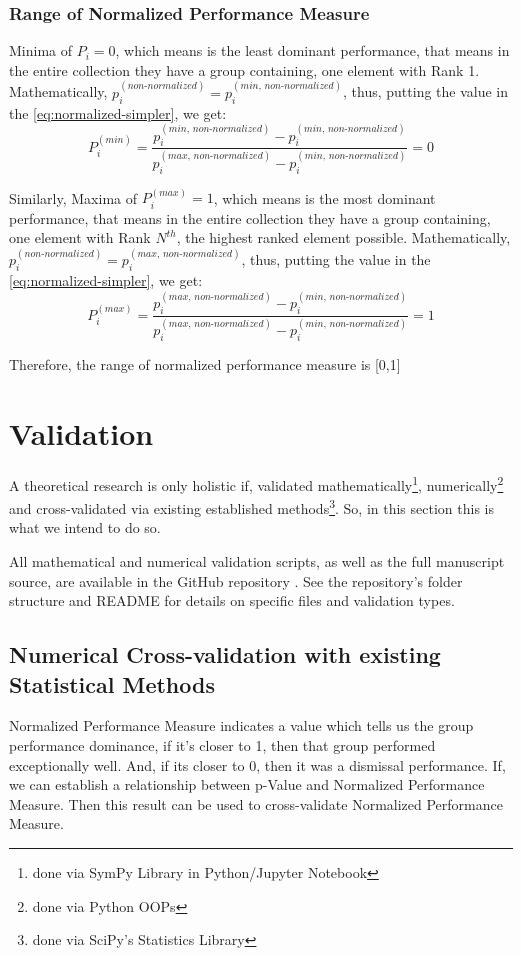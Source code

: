 \documentclass[a4paper,fleqn,review]{cas-sc}
\begin{document}
\subsubsection{Range of Normalized Performance Measure}
Minima of $P_i = 0$, which means is the least dominant performance, that means in the entire collection they have a group containing, one element with Rank 1. Mathematically, $p_i^{(non\text{-}normalized)} =  p_i^{(min, \, non\text{-}normalized)}$, thus, putting the value in the \autoref{eq:normalized-simpler}, we get:
\begin{equation}
	P_i^{(min)} = \frac{p_i^{(min, \, non\text{-}normalized)} - p_i^{(min, \, non\text{-}normalized)}}{p_i^{(max, \, non\text{-}normalized)} - p_i^{(min, \, non\text{-}normalized)}} = 0
\end{equation}

Similarly,
Maxima of $P_i^{(max)} = 1$, which means is the most dominant performance, that means in the entire collection they have a group containing, one element with Rank $N^{th}$, the highest ranked element possible. Mathematically, $p_i^{(non\text{-}normalized)} =  p_i^{(max, \, non\text{-}normalized)}$, thus, putting the value in the \autoref{eq:normalized-simpler}, we get:
\begin{equation}
	P_i^{(max)} = \frac{p_i^{(max, \, non\text{-}normalized)} - p_i^{(min, \, non\text{-}normalized)}}{p_i^{(max, \, non\text{-}normalized)} - p_i^{(min, \, non\text{-}normalized)}} = 1
\end{equation}

Therefore, the range of normalized performance measure is [0,1]


\section{Validation}
A theoretical research is only holistic if, validated mathematically\footnote{done via SymPy Library in Python/Jupyter Notebook}, numerically\footnote{done via Python OOPs} and cross-validated via existing established methods\footnote{done via SciPy's Statistics Library}. So, in this section this is what we intend to do so.

All mathematical and numerical validation scripts, as well as the full manuscript source, are available in the GitHub repository \cite{silentkarmi2025normalized}. See the repository's folder structure and README for details on specific files and validation types.

\subsection{Numerical Cross-validation with existing Statistical Methods}
Normalized Performance Measure indicates a value which tells us the group performance dominance, if it's closer to 1, then that group performed exceptionally well. And, if its closer to 0, then it was a dismissal performance. If, we can establish a relationship between p-Value and Normalized Performance Measure. Then this result can be used to cross-validate Normalized Performance Measure.
\end{document}

